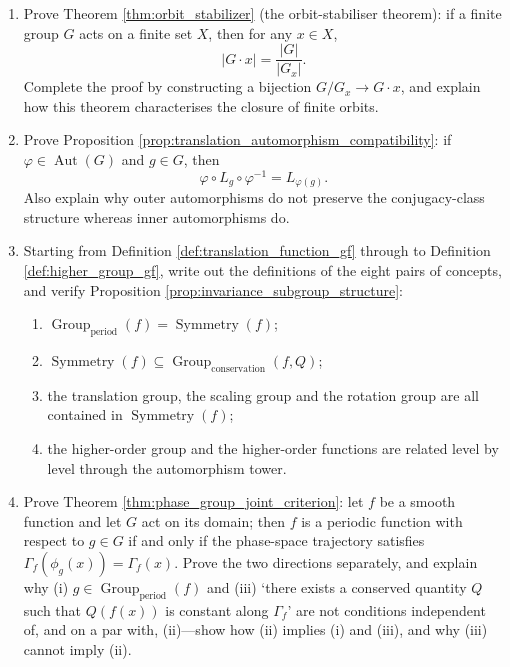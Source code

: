\begin{enumerate}[leftmargin=3em, label=\textbf{Exercise \arabic*}]
    \item Prove Theorem \ref{thm:orbit_stabilizer} (the orbit-stabiliser theorem):
    if a finite group $G$ acts on a finite set $X$, then for any $x\in X$,
    \[
    |G\cdot x|=\frac{|G|}{|G_x|}.
    \]
    Complete the proof by constructing a bijection $G/G_x\to G\cdot x$,
    and explain how this theorem characterises the closure of finite orbits.

    \item Prove Proposition \ref{prop:translation_automorphism_compatibility}:
    if $\varphi\in\operatorname{Aut}(G)$ and $g\in G$, then
    \[
    \varphi\circ L_g\circ\varphi^{-1}=L_{\varphi(g)}.
    \]
    Also explain why outer automorphisms do not preserve the conjugacy-class structure whereas inner automorphisms do.

    \item Starting from Definition \ref{def:translation_function_gf} through to Definition \ref{def:higher_group_gf},
    write out the definitions of the eight pairs of concepts, and verify Proposition \ref{prop:invariance_subgroup_structure}:
    \begin{enumerate}[label=(\roman*)]
        \item $\operatorname{Group}_{\mathrm{period}}(f)=\operatorname{Symmetry}(f)$;
        \item $\operatorname{Symmetry}(f)\subseteq\operatorname{Group}_{\mathrm{conservation}}(f,Q)$;
        \item the translation group, the scaling group and the rotation group are all contained in $\operatorname{Symmetry}(f)$;
        \item the higher-order group and the higher-order functions are related level by level through the automorphism tower.
    \end{enumerate}

    \item Prove Theorem \ref{thm:phase_group_joint_criterion}:
    let $f$ be a smooth function and let $G$ act on its domain; then $f$ is a periodic function with respect to $g\in G$ if and only if the phase-space trajectory satisfies $\Gamma_f(\phi_g(x))=\Gamma_f(x)$.
    Prove the two directions separately, and explain why (i) $g\in\operatorname{Group}_{\mathrm{period}}(f)$ and (iii) `there exists a conserved quantity $Q$ such that $Q(f(x))$ is constant along $\Gamma_f$' are not conditions independent of, and on a par with, (ii)---show how (ii) implies (i) and (iii), and why (iii) cannot imply (ii).


\end{enumerate}

